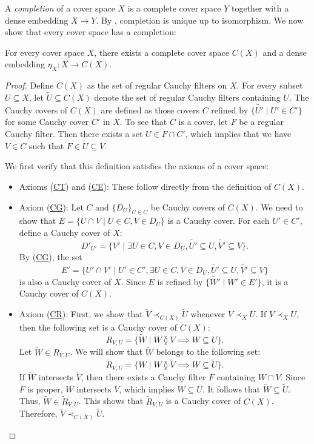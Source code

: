 \documentclass[reqno]{amsart}
\newcommand{\axref}[1]{(\hyperref[ax:#1]{#1})}
\theoremstyle{definition}
\theoremstyle{remark}
\numberwithin{figure}{section}
\newcommand{\overlap}[2]{#1 \between #2}
\newcommand{\rb}{\prec}
\begin{document}
A \emph{completion} of a cover space $X$ is a complete cover space $Y$ together with a dense embedding $X \to Y$.
By , completion is unique up to isomorphism.
We now show that every cover space has a completion:

\begin{thm}[completion]
For every cover space $X$, there exists a complete cover space $C(X)$ and a dense embedding $\eta_X : X \to C(X)$.
\end{thm}
\begin{proof}
Define $C(X)$ as the set of regular Cauchy filters on $X$.
For every subset $U \subseteq X$, let $\widetilde{U} \subseteq C(X)$ denote the set of regular Cauchy filters containing $U$.
The Cauchy covers of $C(X)$ are defined as those covers $C$ refined by $\{ \widetilde{U'} \mid U' \in C' \}$ for some Cauchy cover $C'$ in $X$.
To see that $C$ is a cover, let $F$ be a regular Cauchy filter.
Then there exists a set $U \in F \cap C'$, which implies that we have $V \in C$ such that $F \in \widetilde{U} \subseteq V$.

We first verify that this definition satisfies the axioms of a cover space:
\begin{itemize}
\item Axioms \axref{CT} and \axref{CE}: These follow directly from the definition of $C(X)$.
\item Axiom \axref{CG}: Let $C$ and $\{ D_U \}_{U \in C}$ be Cauchy covers of $C(X)$.
        We need to show that $E = \{ U \cap V \mid U \in C, V \in D_U \}$ is a Cauchy cover.
        For each $U' \in C'$, define a Cauchy cover of $X$:
            \[ D'_{U'} = \{ V' \mid \exists U \in C, V \in D_U, \widetilde{U'} \subseteq U, \widetilde{V'} \subseteq V \}. \]
        By \axref{CG}, the set
            \[ E' = \{ U' \cap V' \mid U' \in C', \exists U \in C, V \in D_U, \widetilde{U'} \subseteq U, \widetilde{V'} \subseteq V \} \]
        is also a Cauchy cover of $X$.
        Since $E$ is refined by $\{ \widetilde{W'} \mid W' \in E' \}$, it is a Cauchy cover of $C(X)$.
\item Axiom \axref{CR}: First, we show that $\widetilde{V} \rb_{C(X)} \widetilde{U}$ whenever $V \rb_X U$.
        If $V \rb_X U$, then the following set is a Cauchy cover of $C(X)$:
            \[ R_{V,U} = \{ \widetilde{W} \mid \overlap{W}{V} \implies W \subseteq U \}. \]
        Let $\widetilde{W} \in R_{V,U}$.
        We will show that $\widetilde{W}$ belongs to the following set:
            \[ \widetilde{R}_{V,U} = \{ W \mid \overlap{W}{\widetilde{V}} \implies W \subseteq \widetilde{U} \}. \]
        If $\widetilde{W}$ intersects $\widetilde{V}$, then there exists a Cauchy filter $F$ containing $W \cap V$.
        Since $F$ is proper, $W$ intersects $V$, which implies $W \subseteq U$.
        It follows that $\widetilde{W} \subseteq \widetilde{U}$.
        Thus, $\widetilde{W} \in \widetilde{R}_{V,U}$.
        This shows that $\widetilde{R}_{V,U}$ is a Cauchy cover of $C(X)$.
        Therefore, $\widetilde{V} \rb_{C(X)} \widetilde{U}$.


\end{itemize}
\end{proof}
\end{document}
